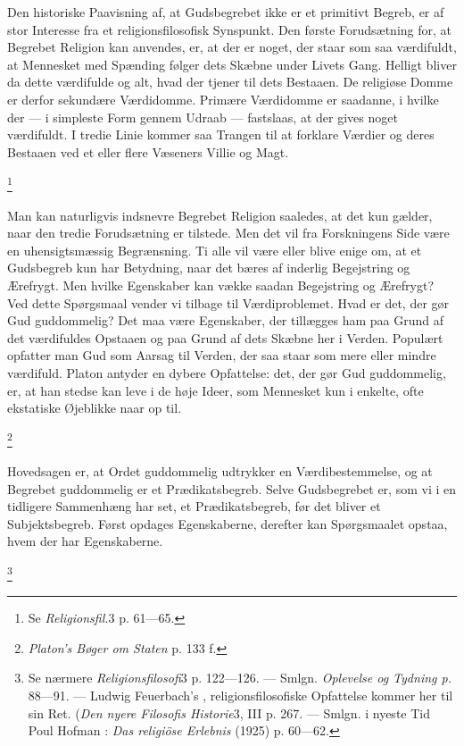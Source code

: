 \documentclass[12pt]{article}
\newcommand{\apage}[1]{\marginnote{\footnotesize\textit{[#1]}}}
\begin{document}
Den historiske Paavisning af, at Gudsbegrebet ikke er et primitivt Begreb, er
af stor Interesse fra et religionsfilosofisk Synspunkt. Den første Forudsætning
for, at Begrebet Religion kan anvendes, er, at der er noget, der staar som saa
værdifuldt, at Mennesket med Spænding følger dets Skæbne under Livets Gang.
Helligt bliver da dette værdifulde og alt, hvad der tjener til dets Bestaaen.
De religiøse Domme er derfor sekundære Værdidomme. Primære Værdidomme er
saadanne, i hvilke der --- i simpleste Form gennem Udraab --- fastslaas, at der
gives noget værdifuldt. I tredie Linie kommer saa Trangen til at forklare
Værdier og deres Bestaaen ved et eller flere Væseners Villie og Magt.

         \footnote{Se \textit{Religionsfil.}3 p. 61---65.}

       Man kan naturligvis indsnevre Begrebet Religion saaledes, at det kun
gælder, naar den tredie Forudsætning er tilstede. Men det vil fra Forskningens
Side være en uhensigtsmæssig Begrænsning. Ti alle vil være eller blive enige
om, at et Gudsbegreb kun har Betydning, naar det bæres af inderlig Begejstring
og Ærefrygt. Men hvilke Egenskaber kan vække saadan Begejstring og Ærefrygt?
Ved dette Spørgsmaal vender vi tilbage til Værdiproblemet. Hvad er det, der gør
Gud guddommelig? Det maa være Egenskaber, der tillægges ham paa Grund af det
værdifuldes Opstaaen og paa Grund af dets Skæbne her i Verden.
\setcounter{footnote}{0}%
\apage{110}Populært opfatter man Gud som Aarsag til Verden, der saa staar som
mere eller mindre værdifuld. Platon antyder en dybere Opfattelse: det, der gør
Gud guddommelig, er, at han stedse kan leve i de høje Ideer, som Mennesket kun
i enkelte, ofte ekstatiske Øjeblikke naar op til.

         \footnote{\textit{Platon's Bøger om Staten }p. 133 f.}

       Hovedsagen er, at Ordet \guillemotright{}guddommelig\guillemotleft{}
udtrykker en Værdibestemmelse, og at Begrebet
\guillemotright{}guddommelig\guillemotleft{} er et Prædikatsbegreb. Selve
Gudsbegrebet er, som vi i en tidligere Sammenhæng har set, et Prædikatsbegreb,
før det bliver et Subjektsbegreb. Først opdages Egenskaberne, derefter kan
Spørgsmaalet opstaa, hvem der \guillemotright{}har\guillemotleft{} Egenskaberne.

         \footnote{Se nærmere \textit{Religionsfilosofi}3 p. 122---126. ---
Smlgn. \textit{Oplevelse og Tydning p.} 88---91. --- Ludwig Feuerbach's ,
religionsfilosofiske Opfattelse kommer her til sin Ret. (\textit{Den nyere
Filosofis Historie}3, III p. 267. --- Smlgn. i nyeste Tid Poul Hofman :
\textit{Das religiöse Erlebnis} (1925) p. 60---62.}
\end{document}
